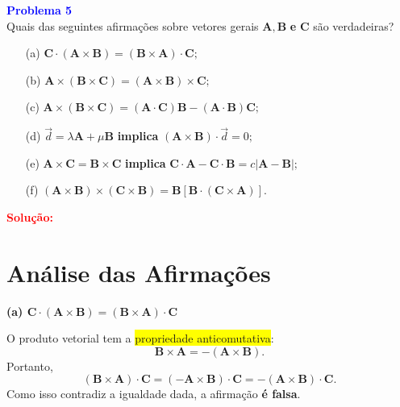\documentclass[a4paper,12pt]{article}
\begin{document}
\begin{flushleft}
\textbf{\textcolor{blue}{\Large Problema 5}}\\

Quais das seguintes afirmações sobre vetores gerais $\mathbf{A}, \mathbf{B}$ \textbf{e} $\mathbf{C}$ são verdadeiras?

\begin{enumerate}
    \item[(a)] $\mathbf{C} \cdot (\mathbf{A} \times \mathbf{B}) = (\mathbf{B} \times \mathbf{A}) \cdot \mathbf{C};$
    \item[(b)] $\mathbf{A} \times (\mathbf{B} \times \mathbf{C}) = (\mathbf{A} \times \mathbf{B}) \times \mathbf{C};$
    \item[(c)] $\mathbf{A} \times (\mathbf{B} \times \mathbf{C}) = (\mathbf{A} \cdot \mathbf{C})\mathbf{B} - (\mathbf{A} \cdot \mathbf{B})\mathbf{C};$
    \item[(d)] $\vec{d} = \lambda \mathbf{A} + \mu \mathbf{B}$ \textbf{implica} $(\mathbf{A} \times \mathbf{B}) \cdot \vec{d} = 0;$
    \item[(e)] $\mathbf{A} \times \mathbf{C} = \mathbf{B} \times \mathbf{C}$ \textbf{implica} $\mathbf{C} \cdot \mathbf{A} - \mathbf{C} \cdot \mathbf{B} = c |\mathbf{A} - \mathbf{B}|;$
    \item[(f)] $(\mathbf{A} \times \mathbf{B}) \times (\mathbf{C} \times \mathbf{B}) = \mathbf{B} [\mathbf{B} \cdot (\mathbf{C} \times \mathbf{A})].$
\end{enumerate}

\textcolor{red}{\textbf{Solução:}}\\

\section*{Análise das Afirmações}

\textbf{(a) $\mathbf{C} \cdot (\mathbf{A} \times \mathbf{B}) = (\mathbf{B} \times \mathbf{A}) \cdot \mathbf{C}$}

O produto vetorial tem a \colorbox{yellow}{propriedade anticomutativa}:
\begin{equation}
    \mathbf{B} \times \mathbf{A} = - (\mathbf{A} \times \mathbf{B}).
\end{equation}
Portanto,
\begin{equation}
    (\mathbf{B} \times \mathbf{A}) \cdot \mathbf{C} = (- \mathbf{A} \times \mathbf{B}) \cdot \mathbf{C} = - (\mathbf{A} \times \mathbf{B}) \cdot \mathbf{C}.
\end{equation}
Como isso contradiz a igualdade dada, a afirmação \colorbox{red!20}{\textbf{é falsa}.}


\end{flushleft}
\end{document}
